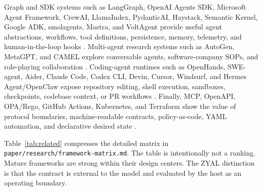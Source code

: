 \documentclass[conference]{IEEEtran}
\newcommand{\ZYAL}{ZYAL}
\begin{document}
Graph and SDK systems such as LangGraph, OpenAI Agents SDK, Microsoft Agent Framework, CrewAI, LlamaIndex, PydanticAI, Haystack, Semantic Kernel, Google ADK, smolagents, Mastra, and VoltAgent provide useful agent abstractions, workflows, tool definitions, persistence, memory, telemetry, and human-in-the-loop hooks \cite{langgraphPersistence2026,openaiAgentsSdk2026,microsoftAgentFramework2026,crewaiDocs2026,llamaIndexAgents2026,pydanticAiAgents2026,haystackAgents2026,semanticKernelAgents2026,googleAdk2026,smolagents2026,mastra2026,voltagent2026}. Multi-agent research systems such as AutoGen, MetaGPT, and CAMEL explore conversable agents, software-company SOPs, and role-playing collaboration \cite{autogen2023,metagpt2023,camel2023}. Coding-agent runtimes such as OpenHands, SWE-agent, Aider, Claude Code, Codex CLI, Devin, Cursor, Windsurf, and Hermes Agent/OpenClaw expose repository editing, shell execution, sandboxes, checkpoints, codebase context, or PR workflows \cite{openhands2024,sweAgent2024,aiderDocs2026,claudeCodePermissions2026,codexCliHelp2026,devinDocs2026,cursorAgentDocs2026,windsurfCascade2026,hermesAgentRepo2026}. Finally, MCP, OpenAPI, OPA/Rego, GitHub Actions, Kubernetes, and Terraform show the value of protocol boundaries, machine-readable contracts, policy-as-code, YAML automation, and declarative desired state \cite{mcpDocs2026,openApiSpec2026,opaRego2026,githubActionsSyntax2026,kubernetesDeclarative2023,terraformIac2026}.

Table~\ref{tab:related} compresses the detailed matrix in \texttt{paper/research/framework-matrix.md}. The table is intentionally not a ranking. Mature frameworks are strong within their design centers. The \ZYAL{} distinction is that the contract is external to the model and evaluated by the host as an operating boundary.
\end{document}
